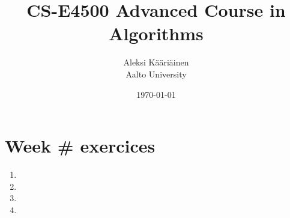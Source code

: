 \documentclass[11pt,a4paper]{article}
\title{CS-E4500 Advanced Course in Algorithms}
\author{Aleksi Kääriäinen  \\
	Aalto University  \\
	}
\begin{document}
\date{\today}

\maketitle

\newpage

\section*{Week \# exercices}

\begin{enumerate}
      \item

            \newpage

      \item

            \newpage

      \item

            \newpage

      \item

            \newpage
\end{enumerate}
\end{document}
